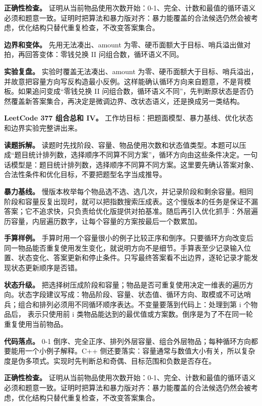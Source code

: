 \textbf{正确性检查。} 证明从当前物品使用次数开始：0-1、完全、计数和最值的循环语义必须和题意一致。证明时把算法和暴力版对齐：暴力能覆盖的合法候选仍然会被考虑，优化结构只替代重复检查，不改变答案集合。

\textbf{边界和变体。} 先用无法凑出、amount 为零、硬币面额大于目标、哨兵溢出做对拍，再回答变体：零钱兑换 II 问组合数，循环语义不同。

\textbf{实验复盘。} 实验时覆盖无法凑出、amount 为零、硬币面额大于目标、哨兵溢出，并故意把容量方向写反构造最小反例。这样能确认循环方向来自题意，不是背模板。如果追问变成“零钱兑换 II 问组合数，循环语义不同”，先判断原状态是否仍然覆盖新答案集合，再决定是微调边界、改状态语义，还是换成另一类结构。

\noindent\textbf{LeetCode 377 组合总和 IV。} 工作坊目标：把题面模型、暴力基线、优化状态和边界实验完整讲出来。

\textbf{读题拆解。} 读题时先找阶段、容量、物品使用次数和状态值类型。本题可以压成“题目统计排列数，选择顺序不同算不同方案”，循环方向由这些条件决定。一句话模型是：题目统计排列数，选择顺序不同算不同方案。这里要先确认答案对象、合法性条件和优化目标，不要把题型名字当成推导。

\textbf{暴力基线。} 慢版本枚举每个物品选不选、选几次，并记录阶段和剩余容量。相同阶段和容量反复出现时，就可以把指数搜索压成表。这个慢版本的任务是保证不漏答案；它不追求快，只负责给优化版提供对拍基准。随后再引入优化抓手：外层遍历容量，内层遍历数字，让每个容量的方案按最后一个数累加。

\textbf{手算样例。} 手算时用一个容量很小的例子比较正序和倒序。只要循环方向改变后同一物品能否重复使用发生变化，就说明方向不是细节。手算表至少记录输入位置、状态变化、答案更新和停止条件。只写最终答案看不出边界，逐轮记录才能发现状态更新顺序是否错。

\textbf{状态升级。} 把选择树压成阶段和容量；物品是否可重复使用决定一维表的遍历方向。状态字段建议写成：物品阶段、容量、状态值、循环方向、取模或不可达哨兵；组合和排列必须用不同循环顺序表达。不变量要落到代码上：处理到第 i 个物品后， 表示只使用前 i 类物品能达到的最优值或方案数。倒序是为了不在同一轮重复使用当前物品。

\textbf{代码落点。} 0-1 倒序、完全正序、排列外层容量、组合外层物品；每种循环方向都要能用一个小例子解释。C++ 侧还要落实：容量通常与数值大小有关，所以复杂度是伪多项式。实现时先判断总和奇偶、目标范围和负数是否存在。

\textbf{正确性检查。} 证明从当前物品使用次数开始：0-1、完全、计数和最值的循环语义必须和题意一致。证明时把算法和暴力版对齐：暴力能覆盖的合法候选仍然会被考虑，优化结构只替代重复检查，不改变答案集合。

